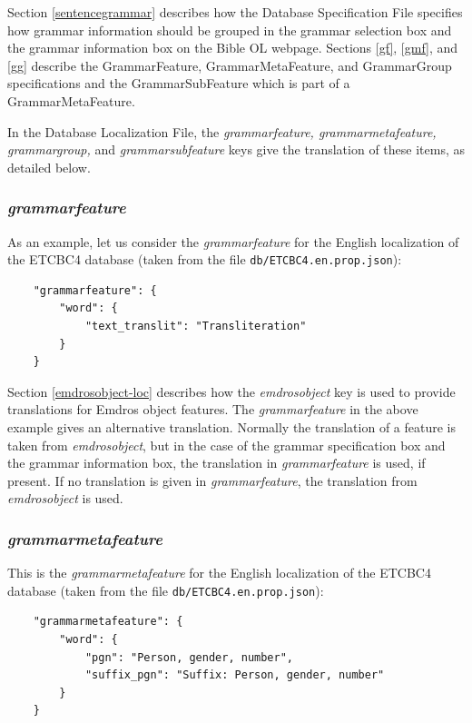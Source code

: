 \documentclass[11pt,oneside,a4paper]{memoir}
\begin{document}
Section \ref{sentencegrammar} describes how the Database Specification File specifies how grammar
information should be grouped in the grammar selection box and the grammar information box on the
Bible OL webpage. Sections \ref{gf}, \ref{gmf}, and \ref{gg} describe the GrammarFeature,
GrammarMetaFeature, and GrammarGroup specifications and the GrammarSubFeature which is part of a
GrammarMetaFeature.

In the Database Localization File, the \emph{grammarfeature, grammarmetafeature, grammargroup,} and
\emph{grammarsubfeature} keys give the translation of these items, as detailed below.

\subsubsection{\emph{grammarfeature}}

As an example, let us consider the \emph{grammarfeature} for the English localization of the
ETCBC4 database (taken from the file \texttt{db/ETCBC4.en.prop.json}):

\begin{lstlisting}
    "grammarfeature": {
        "word": {
            "text_translit": "Transliteration"
        }
    }
\end{lstlisting}

Section \ref{emdrosobject-loc} describes how the \emph{emdrosobject} key is used to provide
translations for Emdros object features. The \emph{grammarfeature} in the above example gives an
alternative translation. Normally the translation of a feature is taken from \emph{emdrosobject},
but in the case of the grammar specification box and the grammar information box, the translation in
\emph{grammarfeature} is used, if present. If no translation is given in \emph{grammarfeature}, the
translation from \emph{emdrosobject} is used.


\subsubsection{\emph{grammarmetafeature}}

This is the \emph{grammarmetafeature} for the English localization of the
ETCBC4 database (taken from the file \texttt{db/ETCBC4.en.prop.json}):

\begin{lstlisting}
    "grammarmetafeature": {
        "word": {
            "pgn": "Person, gender, number",
            "suffix_pgn": "Suffix: Person, gender, number"
        }
    }
\end{lstlisting}
\end{document}
